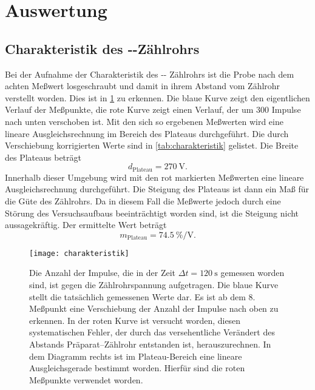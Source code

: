 
\section{Auswertung}

\subsection{Charakteristik des --Zählrohrs}

Bei der Aufnahme der Charakteristik des --
Zählrohrs ist die Probe nach dem achten Meßwert losgeschraubt und damit
in ihrem Abstand vom Zählrohr verstellt worden. Dies ist in
\cref{fig:charakteristik} zu erkennen. Die blaue Kurve zeigt den
eigentlichen Verlauf der Meßpunkte, die rote Kurve zeigt einen Verlauf,
der um 300 Impulse nach unten verschoben ist. Mit den sich so ergebenen
Meßwerten wird eine lineare Ausgleichsrechnung im Bereich des Plateaus
durchgeführt. Die durch Verschiebung korrigierten Werte sind in
\cref{tab:charakteristik} gelistet. Die Breite des Plateaus beträgt
%
\begin{equation}
  d_\text{Plateau} = \SI{270}{\volt}.
\end{equation}
%
Innerhalb dieser Umgebung wird mit den rot markierten Meßwerten eine
lineare Ausgleichsrechnung durchgeführt. Die Steigung des Plateaus ist
dann ein Maß für die Güte des Zählrohrs. Da in diesem Fall die Meßwerte
jedoch durch eine Störung des Versuchsaufbaus beeinträchtigt worden
sind, ist die Steigung nicht aussagekräftig. Der ermittelte Wert beträgt
%
\begin{equation}
  m_\text{Plateau} = \SI{74.5}{\percent\per\volt}.
\end{equation}

\begin{figure}
  \centering
  \texttt{[image: charakteristik]}
  \caption{Die Anzahl der Impulse, die in der Zeit $\Delta t =
    \SI{120}{\second}$ gemessen worden sind, ist gegen die
    Zählrohrspannung aufgetragen. Die blaue Kurve stellt die tatsächlich
    gemessenen Werte dar. Es ist ab dem 8. Meßpunkt eine Verschiebung
    der Anzahl der Impulse nach oben zu erkennen. In der roten Kurve ist
    versucht worden, diesen systematischen Fehler, der durch das
    versehentliche Verändert des Abstands Präparat--Zählrohr entstanden
    ist, herauszurechnen. In dem Diagramm rechts ist im Plateau-Bereich
    eine lineare Ausgleichsgerade bestimmt worden. Hierfür sind die
    roten Meßpunkte verwendet worden.}
  \label{fig:charakteristik}
\end{figure}

